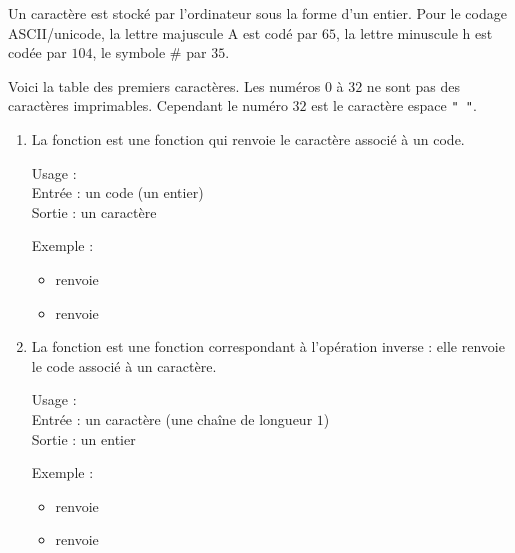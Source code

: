 \documentclass[11pt,class=report,crop=false]{standalone}
\begin{document}
\begin{cours}


Un caractère est stocké par l'ordinateur sous la forme d'un entier.
Pour le codage ASCII/unicode, la lettre majuscule \og{}A\fg{} est codé par $65$, la lettre minuscule \og{}h\fg{} est codée par $104$, le symbole \og{}\#\fg{} par $35$.

Voici la table des premiers caractères. Les numéros $0$ à $32$ ne sont pas des caractères imprimables. Cependant le numéro $32$ est le caractère espace \lstinline!" "!.



\begin{enumerate}  

  \item La fonction  est une fonction \Python{} qui renvoie le caractère associé à un code.
  
  \begin{fonctionpython}
  Usage : \\
   Entrée : un code (un entier)\\
   Sortie : un caractère
  
  \medskip
     
   Exemple :
  \begin{itemize}  
    \item {} renvoie 
    \item {} renvoie 
  \end{itemize} 
  \end{fonctionpython} 
  
  \item La fonction  est une fonction \Python{} correspondant à l'opération inverse : elle renvoie le code associé à un caractère.
  
  \begin{fonctionpython}
  Usage : \\
   Entrée : un caractère (une chaîne de longueur $1$)\\
   Sortie : un entier
  
  \medskip
     
   Exemple :
  \begin{itemize}  
    \item {} renvoie 
    \item {} renvoie 
  \end{itemize} 
  \end{fonctionpython}  
\end{enumerate}
\end{cours}
\end{document}
